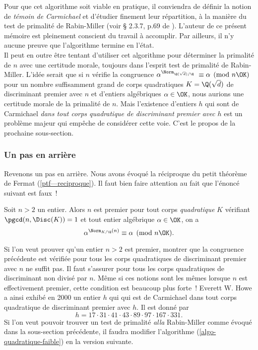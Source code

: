 Pour que cet algorithme soit viable en pratique, il conviendra de définir la notion de \textit{témoin de Carmichael} et d'étudier finement leur répartition, à la manière du test de primalité de Rabin-Miller (voir § 2.3.7, p.69 de \cite{Demazure}). L'auteur de ce présent mémoire est pleinement conscient du travail à accomplir. Par ailleurs, il n'y aucune preuve que l'algorithme termine en l'état. \\

Il peut en outre être tentant d'utiliser cet algorithme pour déterminer la primalité de $n$ avec une certitude morale, toujours dans l'esprit test de primalité de Rabin-Miller. L'idée serait que si $n$ vérifie la congruence $\alpha^{\Norm_{\Q(\sqrt{d})/\Q}} \equiv \alpha \pmod{n\OK}$ pour un nombre suffisamment grand de corps quadratiques $K = \Q(\sqrt{d})$ de discriminant premier avec $n$ et d'entiers algébriques $\alpha \in \OK$, nous aurions une certitude morale de la primalité de $n$. Mais l'existence d'entiers $h$ qui sont de Carmichael \emph{dans tout corps quadratique de discriminant premier avec $h$} est un problème majeur qui empêche de considérer cette voie. C'est le propos de la prochaine sous-section.

\subsubsection{Un pas en arrière}

Revenons un pas en arrière. Nous avons évoqué la réciproque du petit théorème de Fermat (\ref{ptf—reciproque}). Il faut bien faire attention au fait que l'énoncé suivant est faux~!

\begin{enoncefaux}
	Soit $n>2$ un entier. Alors $n$ est premier \ssi pour tout corps \emph{quadratique} $K$ vérifiant $\pgcd(n, \Disc(K)) = 1$ et tout entier algébrique $\alpha \in \OK$, on a $$\alpha^{\Norm_{K/\Q}(n)} \equiv \alpha \pmod{n\OK}.$$
\end{enoncefaux}

Si l'on veut prouver qu'un entier $n>2$ est premier, montrer que la congruence précédente est vérifiée pour tous les corps quadratiques de discriminant premier avec $n$ ne suffit pas. Il faut s'assurer pour tous les corps quadratiques de discriminant non divisé par $n$. Même si ces notions sont les mêmes lorsque $n$ est effectivement premier, cette condition est beaucoup plus forte~! Everett W. Howe a ainsi exhibé en 2000 un entier $h$ qui qui est de Carmichael dans tout corps quadratique de discriminant premier avec $h$. Il est donné par $$h = 17 \cdot 31 \cdot 41 \cdot 43 \cdot 89 \cdot 97 \cdot 167 \cdot 331.$$ Si l'on veut pouvoir trouver un test de primalité \emph{alla} Rabin-Miller comme évoqué dans la sous-section précédente, il faudra modifier l'algorithme (\ref{algo-quadratique-faible}) en la version suivante.


